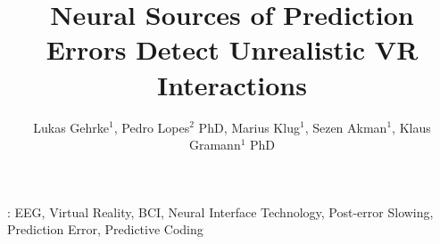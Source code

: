 \documentclass[12pt]{iopart}
\begin{document}
\title[Neural Sources Detecting Unrealistic VR Interactions]{Neural Sources of Prediction Errors Detect Unrealistic VR Interactions}


\author{Lukas Gehrke$^1$, Pedro Lopes$^2$ PhD, Marius Klug$^1$, Sezen Akman$^1$, Klaus Gramann$^{1}$ PhD}
\address{$^1$Biological Psychology and Neuroergonomics, Department of Psychology and Ergonomics, TU Berlin, Germany}
\address{$^2$University of Chicago, USA}







%
\vspace{2pc}
: EEG, Virtual Reality, BCI, Neural Interface Technology, Post-error Slowing, Prediction Error, Predictive Coding
%
\submitto{\JNE}
%
% 
%
\end{document}
